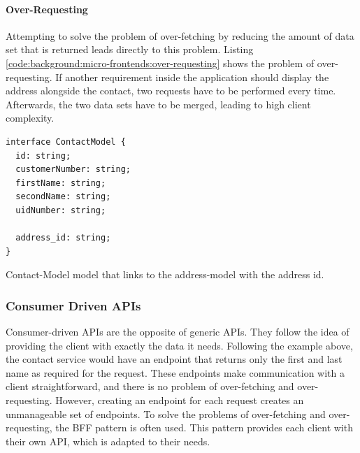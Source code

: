 \paragraph{Over-Requesting}\label{paragraph:background:micro-frontend:generic-vs-consumer-driven-apis:generic-apis:over-requesting}

Attempting to solve the problem of over-fetching by reducing the amount of data set that is returned leads directly to this problem. Listing \ref{code:background:micro-frontends:over-requesting} shows the problem of over-requesting. If another requirement inside the application should display the address alongside the contact, two requests have to be performed every time. Afterwards, the two data sets have to be merged, leading to high client complexity. \cite{misc:2019:leitner:background:micro-frontends:backend-for-frontends}

\ifshowListings
\begin{listing}[H]
    \begin{verbatim}
interface ContactModel {
  id: string;
  customerNumber: string;
  firstName: string;
  secondName: string;
  uidNumber: string;

  address_id: string;
}
    \end{verbatim}
    \caption{Contact-Model model that links to the address-model with the address id.}\label{code:background:micro-frontends:over-requesting}
\end{listing}
\fi

\subsubsection{Consumer Driven \acp{API}}\label{subsubection:background:micro-frontend:generic-vs-consumer-driven-apis:consumer-driven-apis}

Consumer-driven \acp{API} are the opposite of generic \acp{API}. They follow the idea of providing the client with exactly the data it needs. Following the example above, the contact service would have an endpoint that returns only the first and last name as required for the request. These endpoints make communication with a client straightforward, and there is no problem of over-fetching and over-requesting. However, creating an endpoint for each request creates an unmanageable set of endpoints.  \cite{misc:2019:leitner:background:micro-frontends:backend-for-frontends} To solve the problems of over-fetching and over-requesting, the \ac{BFF} pattern is often used. This pattern provides each client with their own \ac{API}, which is adapted to their needs. \cite{book:2018:richardson:background:bff:microservices-patterns}

